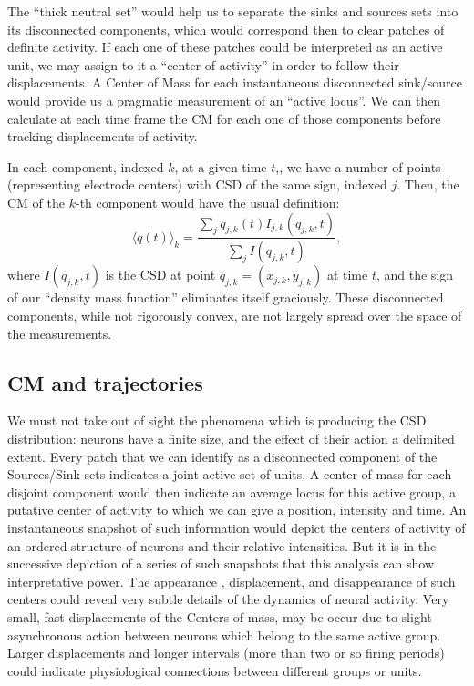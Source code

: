 \documentclass[utf8]{frontiersSCNS}
\begin{document}
The ``thick neutral set'' would help us to separate the sinks and sources sets into
its disconnected components, which would correspond then to clear patches of
definite activity. If each one of these patches could be
interpreted as an active unit,
we may assign to it a ``center of activity'' in order to follow their displacements.
A Center of Mass for each instantaneous disconnected sink/source would provide us
a pragmatic measurement of an ``active locus''. We can then calculate at each time
frame the CM for each one of those components before tracking displacements of activity.

In each component, indexed $k$, at a given time $t$,, we have a number of points
(representing electrode centers)
with CSD of the same sign, indexed $j$. Then, the CM of the $k$-th
component would have the usual definition:
\begin{equation}\label{cmparadisj}
   \langle q(t) \rangle_k =\frac{\sum_j q_{j,k} (t) I_{j,k} (q_{j,k},t)}
           {\sum_j I(q_{j,k},t)},
\end{equation}
where $I(q_{j,k},t)$ is the CSD at point $q_{j,k}=(x_{j,k}, y_{j,k})$ at time $t$,
and the
sign of our ``density mass function'' eliminates itself graciously.
These disconnected components, while not rigorously convex,
are not largely spread over the space of the measurements.



\subsection{CM and trajectories}

We must not take out of sight the phenomena which is producing the CSD distribution:
neurons have a finite size, and the effect of their action a delimited extent.
Every patch that we can identify as a disconnected component of the Sources/Sink
sets indicates a joint active set of units. A center of mass for each disjoint
component would then indicate an average locus for this active group, a putative center of activity to which we can give a position, intensity and time. An instantaneous snapshot of such information would depict the centers of activity of an ordered structure of neurons and their relative intensities. But it is in the successive depiction of a series of such snapshots that this analysis can show interpretative power. The appearance , displacement, and disappearance of such centers could reveal very subtle details of the dynamics of neural activity. Very small, fast displacements of the Centers of mass, may be occur due to slight asynchronous action between neurons which belong to the same active group.
Larger displacements and longer intervals (more than two or so firing periods)
could indicate physiological connections between different groups or units.
\end{document}
